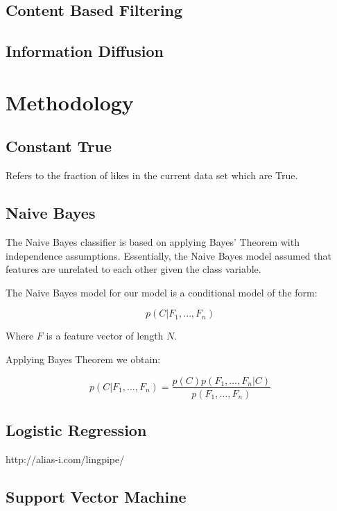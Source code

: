 \subsection{Content Based Filtering}
\label{sec:cbf}

\subsection{Information Diffusion}
\label{sec:id}

\section{Methodology}
\label{sec:meth}

\subsection{Constant True}
\label{sec:const}

Refers to the fraction of likes in the current data set which are True.

\subsection{Naive Bayes}
\label{sec:nb}

The Naive Bayes classifier is based on applying Bayes' Theorem with independence assumptions. Essentially, the Naive Bayes model assumed that features 
are unrelated to each other given the class variable.

The Naive Bayes model for our model is a conditional model of the form:

\[
 p(C | F_1,\dots,F_n)
\]

Where \( F \) is a feature vector of length \( N \).

Applying Bayes Theorem we obtain:

\[
 p(C|F_1,\dots,F_n) = \frac{p(C)p(F_1,\dots,F_n|C)}{p(F_1,\dots,F_n)}
\]

\subsection{Logistic Regression}
\label{sec:lr}

http://alias-i.com/lingpipe/

\subsection{Support Vector Machine}
\label{sec:svm}

